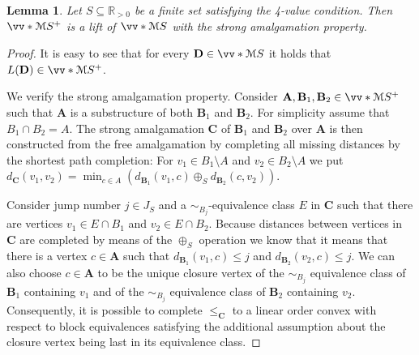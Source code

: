 \documentclass{elsarticle}
\def\ordclasssup#1#2{\vv*{#1}{#2}}
\def\str#1{\mathbf {#1}}
\theoremstyle{plain}
\newtheorem{lemma}[theorem]{Lemma}
\theoremstyle{definition}
\theoremstyle{remark}
\begin{document}
\begin{lemma}
Let $S\subseteq \mathbb R_{>0}$ be a finite set satisfying the 4-value condition. Then $\ordclasssup{\mathcal M}{S}^+$ is a lift of $\ordclasssup{\mathcal M}{S}$ with the strong amalgamation property.
\end{lemma}
\begin{proof}
It is easy to see that for every $\str{D}\in \ordclasssup{\mathcal M}{S}$ it holds that $L(\str{D})\in \ordclasssup{\mathcal M}{S}^+$.

We verify the strong amalgamation property.
Consider $\str{A},\str{B}_1,\str{B}_2\in \ordclasssup{\mathcal M}{S}^+$ such that $\str{A}$ is a substructure of both $\str{B}_1$ and $\str{B}_2$.
For simplicity assume that $B_1\cap B_2=A$.
The strong amalgamation $\str{C}$ of $\str{B}_1$ and $\str{B}_2$ over $\str{A}$ is then constructed from the free amalgamation 
by completing all missing distances by the shortest path completion:
For $v_1 \in B_1\setminus A$ and $v_2\in B_2\setminus A$ we put $d_\str{C}(v_1,v_2)=\min_{c\in A}(d_{\str B_1}(v_1,c)\oplus_S d_{\str B_2}(c,v_2))$.

Consider jump number $j\in J_S$ and a $\sim_{B_j}$-equivalence class $E$ in $\str{C}$
such that there are vertices $v_1\in E\cap B_1$ and $v_2\in E\cap B_2$.
Because distances between vertices in $\str{C}$ are completed by means of the $\oplus_S$ operation we know that it
means that there is a vertex $c\in \str{A}$ such that $d_{\str{B}_1}(v_1,c)\leq j$ and $d_{\str{B}_2}(v_2,c)\leq j$.
We can also choose $c\in \str{A}$ to be the unique closure vertex of the  $\sim_{B_j}$ equivalence class  of $\str{B}_1$
containing $v_1$ and of the $\sim_{B_j}$ equivalence class  of $\str{B}_2$ containing $v_2$. Consequently, 
it is possible to complete $\leq_\str{C}$ to a linear order convex with respect to block equivalences
satisfying the additional assumption about the closure vertex being last in its equivalence class.
\end{proof}
\end{document}
